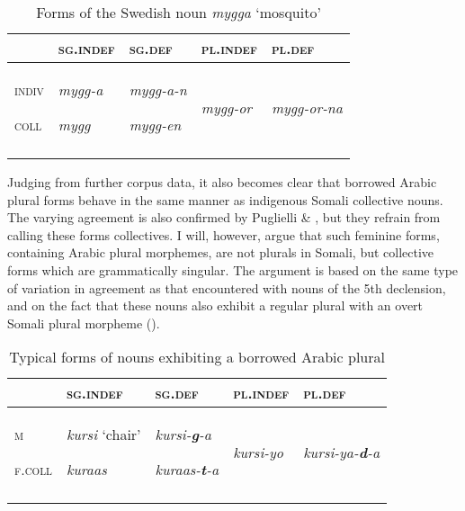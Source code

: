 \documentclass[output=paper]{langsci/langscibook}
\begin{document}
\begin{table}
\caption{Forms of the Swedish noun \textit{mygga} ‘mosquito’}
\label{tab:11}
\begin{tabularx}{\textwidth}{XXXXX} 
\lsptoprule
& {\textsc{sg.indef}} & {\textsc{sg.def}} & {\textsc{pl.indef}} & {\textsc{pl.def}}\\
\midrule
{\textsc{indiv}}

{\textsc{coll}} & {\textit{mygg-a}}

{\textit{mygg}} & {\textit{mygg-a-n}}

{\textit{mygg-en}} & {\textit{mygg-or}} & {\textit{mygg-or-na}}\\
\lspbottomrule
\end{tabularx}

\end{table} 



Judging from further corpus data, it also becomes clear that borrowed Arabic plural forms behave in the same manner as indigenous Somali collective nouns. The varying agreement is also confirmed by Puglielli \& \citet[86]{Siyaad1984}, but they refrain from calling these forms collectives. I will, however, argue that such feminine forms, containing Arabic plural morphemes, are not plurals in Somali, but collective forms which are grammatically singular. The argument is based on the same type of variation in agreement as that encountered with nouns of the 5th declension, and on the fact that these nouns also exhibit a regular plural with an overt Somali plural morpheme ().
 
\begin{table}
\caption{Typical forms of nouns exhibiting a borrowed Arabic plural}
\label{tab:12}
\begin{tabularx}{\textwidth}{XXXXX}
\lsptoprule
 & {\textsc{sg.indef}} & {\textsc{sg.def}} & {\textsc{pl.indef}} & {\textsc{pl.def}}\\
\midrule
{\textsc{m}}

{\textsc{f.coll}} & {\textit{kursi} ‘chair’}

{\textit{kuraas}} & {\textit{kursi-}\textbf{\textit{g}}\textit{-a}}

{\textit{kuraas-}\textbf{\textit{t}}\textit{-a}} & {\textit{kursi-yo}} & {\textit{kursi-ya-}\textbf{\textit{d}}\textit{-a}}\\
\lspbottomrule
\end{tabularx}

\end{table} 
\end{document}
